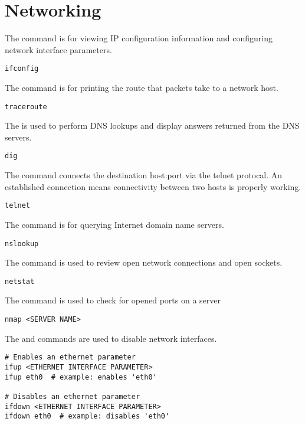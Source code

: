 \section{Networking}

The  command is for viewing IP configuration information and configuring network interface parameters.
\begin{lstlisting}
ifconfig
\end{lstlisting}

The  command is for printing the route that packets take to a network host.
\begin{lstlisting}
traceroute
\end{lstlisting}

The  is used to perform DNS lookups and display answers returned from the DNS servers.
\begin{lstlisting}
dig
\end{lstlisting}

The  command connects the destination host:port via the telnet protocal. An established connection means connectivity between two hosts is properly working.
\begin{lstlisting}
telnet
\end{lstlisting}

The  command is for querying Internet domain name servers.
\begin{lstlisting}
nslookup
\end{lstlisting}

The  command is used to review open network connections and open sockets. 
\begin{lstlisting}
netstat
\end{lstlisting}

The  command is used to check for opened ports on a server
\begin{lstlisting}
nmap <SERVER NAME>
\end{lstlisting}

The  and  commands are used to disable network interfaces.
\begin{lstlisting}
# Enables an ethernet parameter
ifup <ETHERNET INTERFACE PARAMETER>
ifup eth0  # example: enables 'eth0'

# Disables an ethernet parameter
ifdown <ETHERNET INTERFACE PARAMETER>
ifdown eth0  # example: disables 'eth0'
\end{lstlisting}

